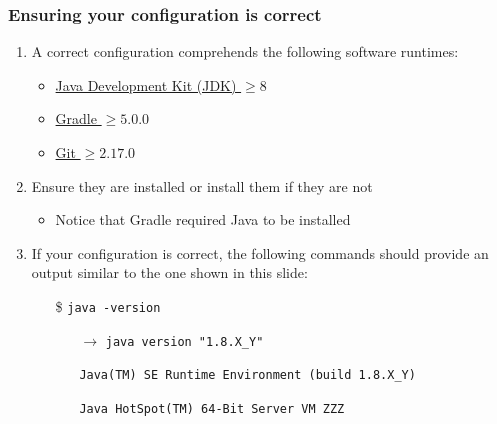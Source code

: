 \documentclass[handout]{beamer}\mode<presentation>{\usetheme{AMSCesenaPurpleAndGold}}
\begin{document}
\begin{frame}[allowframebreaks]
\frametitle{Ensuring your configuration is correct}

	\begin{enumerate}

    \item A correct configuration comprehends the following software runtimes:
    \begin{itemize}
        \item \href{http://www.oracle.com/technetwork/java/javase/downloads/jdk8-downloads-2133151.html}{Java Development Kit (JDK) $\geq 8$} 
        \item \href{https://gradle.org/releases}{Gradle $\geq 5.0.0$}
        \item \href{https://git-scm.com}{Git $\geq 2.17.0$}
    \end{itemize}

	\item Ensure they are installed or install them if they are not
	\begin{itemize}
		\item Notice that Gradle required Java to be installed
	\end{itemize}
    
    \framebreak
    
    \item If your configuration is correct, the following commands should provide an output similar to the one shown in this slide:
    \begin{itemize}
        \item[\$] \texttt{java -version}
        \begin{itemize}
            \item[$\rightarrow$] \texttt{java version "1.8.X\_Y"}
            \item[] \texttt{Java(TM) SE Runtime Environment (build 1.8.X\_Y)}
            \item[] \texttt{Java HotSpot(TM) 64-Bit Server VM ZZZ}
        \end{itemize}
        

\end{itemize}
\end{enumerate}
\end{frame}
\end{document}
